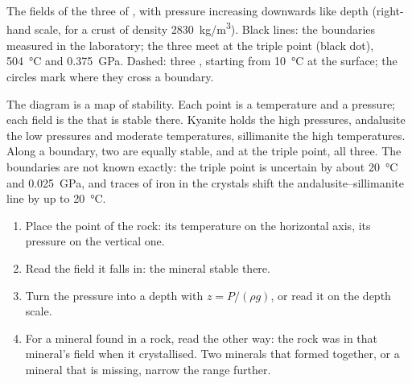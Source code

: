 \begin{omfigure}
{\small The fields of the three  of , with pressure
increasing downwards like depth (right-hand scale, for a crust of density
\qty{2830}{kg/m^3}). Black lines: the boundaries measured in the laboratory;
the three meet at the triple point (black dot), \qty{504}{\celsius} and
\qty{0.375}{GPa}. Dashed: three , starting from \qty{10}{\celsius}
at the surface; the circles mark where they cross a boundary.}
\end{omfigure}

The diagram is a map of stability. Each point is a temperature and a
pressure; each field is the  that is stable there. Kyanite holds
the high pressures, andalusite the low pressures and moderate temperatures,
sillimanite the high temperatures. Along a boundary, two  are
equally stable, and at the triple point, all three. The boundaries are not
known exactly: the triple point is uncertain by about \qty{20}{\celsius} and
\qty{0.025}{GPa}, and traces of iron in the crystals shift the
andalusite--sillimanite line by up to \qty{20}{\celsius}.

\begin{method}\label{met:g12:metamorphic-rocks:pt}
\begin{enumerate}
  \item Place the point of the rock: its temperature on the horizontal
        axis, its pressure on the vertical one.
  \item Read the field it falls in: the mineral stable there.
  \item Turn the pressure into a depth with $z = P/(\rho g)$, or read it on
        the depth scale.
  \item For a mineral found in a rock, read the other way: the rock was in
        that mineral's field when it crystallised. Two minerals that formed
        together, or a mineral that is missing, narrow the range further.
\end{enumerate}
\end{method}


